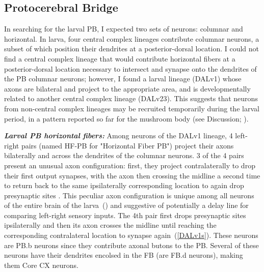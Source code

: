     \subsection{Protocerebral Bridge}
    \label{PB}
    In searching for the larval PB, I expected two sets of neurons: columnar and horizontal. In larva, four central complex lineages contribute columnar neurons, a subset of which position their dendrites at a posterior-dorsal location. I could not find a central complex lineage that would contribute horizontal fibers at a posterior-dorsal location necessary to intersect and synapse onto the dendrites of the PB columnar neurons; however, I found a larval lineage (DALv1) whose axons are bilateral and project to the appropriate area, and is developmentally related to another central complex lineage (DALv23). This suggests that neurons from non-central complex lineages may be recruited temporarily during the larval period, in a pattern reported so far for the mushroom body (see Discussion; \citep{truman2023metamorphosis}). 

    \textbf{\textit{Larval PB horizontal fibers:}}
    Among neurons of the DALv1 lineage, 4 left-right pairs (named HF-PB for "Horizontal Fiber PB") project their axons bilaterally and across the dendrites of the columnar neurons.
    3 of the 4 pairs present an unusual axon configuration: first, they project contralaterally to drop their first output synapses, with the axon then crossing the midline a second time to return back to the same ipsilaterally corresponding location to again drop presynaptic sites .
    This peculiar axon configuration is unique among all neurons of the entire brain of the larva~(\citep{winding2023connectome}) and suggestive of potentially a delay line for comparing left-right sensory inputs.
    The 4th pair first drops presynaptic sites ipsilaterally and then its axon crosses the midline until reaching the corresponding contralateral location to synapse again~(\ref{DALv1s}). These neurons are PB.b neurons since they contribute axonal butons to the PB. Several of these neurons have their dendrites encolsed in the FB (are FB.d neurons), making them Core CX neurons. 

